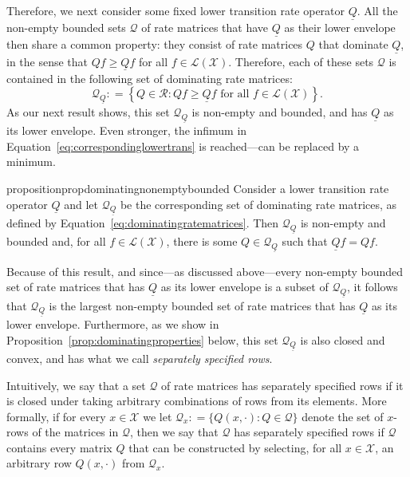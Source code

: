 \documentclass[10pt,a4paper]{paper}
\theoremstyle{definition}
\newcommand{\states}{\mathcal{X}}
\newcommand{\gambles}{\mathcal{L}}
\newcommand{\gamblesX}{\gambles(\states)}
\newcommand{\rateset}{\mathcal{Q}}
\newcommand{\lrate}{\underline{Q}}
\newcommand{\coloneqq}{:\!=}
\begin{document}
Therefore, we next consider some fixed lower transition rate operator $\lrate$.
All the non-empty bounded sets $\rateset$ of rate matrices that have $\lrate$ as their lower envelope then share a common property: they consist of rate matrices $Q$ that dominate $\lrate$, in the sense that $Qf\geq\lrate f$ for all $f\in\gamblesX$. Therefore, each of these sets $\rateset$ is contained in the following set of dominating rate matrices:
\begin{equation}\label{eq:dominatingratematrices}
\rateset_{\lrate}\coloneqq
\left\{
Q\in\mathcal{R}
\colon
Qf\geq\lrate f\text{ for all $f\in\gamblesX$}
\right\}.
\end{equation}
As our next result shows, this set $\rateset_{\lrate}$ is non-empty and bounded, and has $\lrate$ as its lower envelope. Even stronger, the infimum in Equation~\eqref{eq:correspondinglowertrans} is reached---can be replaced by a minimum.

\begin{restatable}{proposition}{propdominatingnonemptybounded}
\label{prop:dominating_nonempty_bounded}
Consider a lower transition rate operator $\lrate$ and let $\rateset_{\lrate}$ be the corresponding set of dominating rate matrices, as defined by Equation~\eqref{eq:dominatingratematrices}. Then $\rateset_{\lrate}$ is non-empty and bounded and, for all $f\in\gamblesX$, there is some $Q\in\rateset_{\lrate}$ such that $\lrate f=Qf$.
\end{restatable}

\noindent
Because of this result, and since---as discussed above---every non-empty bounded set of rate matrices that has $\lrate$ as its lower envelope is a subset of $\rateset_{\lrate}$, it follows that $\rateset_{\lrate}$ is the largest non-empty bounded set of rate matrices that has $\lrate$ as its lower envelope.
Furthermore, as we show in Proposition~\ref{prop:dominatingproperties} below, this set $\rateset_{\lrate}$ is also closed and convex, and has what we call \emph{separately specified rows}. 

Intuitively, we say that a set $\rateset$ of rate matrices has separately specified rows if it is closed under taking arbitrary combinations of rows from its elements. More formally, if for every $x\in\states$ we let $\rateset_x\coloneqq\{Q(x,\cdot):Q\in\rateset\}$ denote the set of $x$-rows of the matrices in $\rateset$, then we say that $\rateset$ has separately specified rows if $\rateset$ contains every matrix $Q$ that can be constructed by selecting, for all $x\in\states$, an arbitrary row $Q(x,\cdot)$ from $\rateset_x$.
\end{document}
